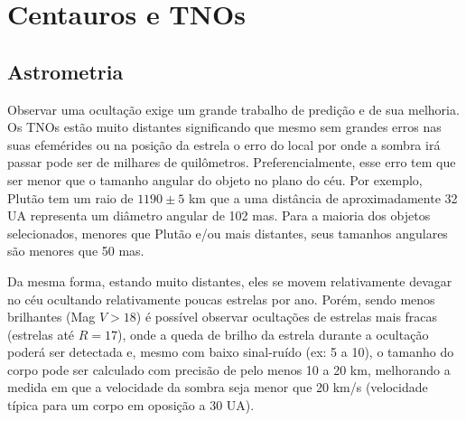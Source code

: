 \documentclass[12pt,a4paper]{monografia}
\begin{document}


\chapter{Centauros e TNOs}
\label{Cap: TNOs}

\section{Astrometria}
\label{Sec: TNOs-astrometria}

\indent \indent Observar uma ocultação exige um grande trabalho de predição e de sua melhoria. Os TNOs estão muito distantes significando que mesmo sem grandes erros nas suas efemérides ou na posição da estrela o erro do local por onde a sombra irá passar pode ser de milhares de quilômetros. Preferencialmente, esse erro tem que ser menor que o tamanho angular do objeto no plano do céu. Por exemplo, Plutão tem um raio de $1190 \pm 5$ km \cite[submetido]{DiasOliveira2015} que a uma distância de aproximadamente 32 UA representa um diâmetro angular de 102 mas. Para a maioria dos objetos selecionados, menores que Plutão e/ou mais distantes, seus tamanhos angulares são menores que 50 mas.

Da mesma forma, estando muito distantes, eles se movem relativamente devagar no céu ocultando relativamente poucas estrelas por ano. Porém, sendo menos brilhantes (Mag $V > 18$) é possível observar ocultações de estrelas mais fracas (estrelas até $R = 17$), onde a queda de brilho da estrela durante a ocultação poderá ser detectada e, mesmo com baixo sinal-ruído (ex: 5 a 10), o tamanho do corpo pode ser calculado com precisão de pelo menos 10 a 20 km, melhorando a medida em que a velocidade da sombra seja menor que 20 km/s (velocidade típica para um corpo em oposição a 30 UA).
\end{document}
